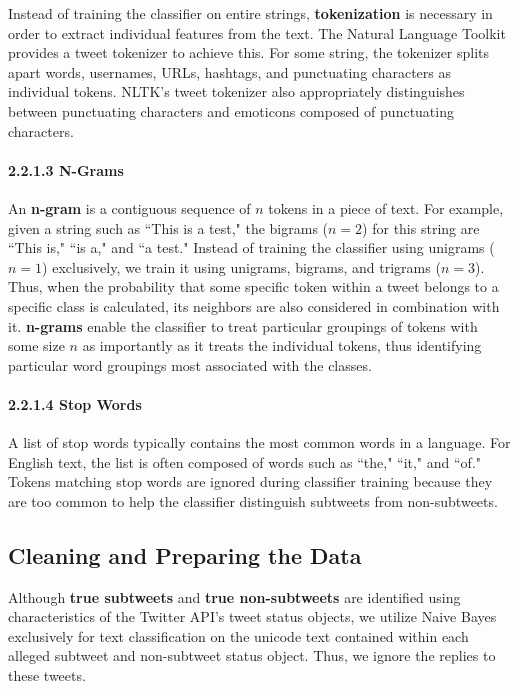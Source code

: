 \documentclass[11pt, twoside, reqno]{book}
\begin{document}
Instead of training the classifier on entire strings, \textbf{tokenization} is necessary in order to extract individual features from the text. The Natural Language Toolkit \cite{nltk} provides a tweet tokenizer to achieve this. For some string, the tokenizer splits apart words, usernames, URLs, hashtags, and punctuating characters as individual tokens. NLTK's tweet tokenizer also appropriately distinguishes between punctuating characters and emoticons composed of punctuating characters.

\paragraph{2.2.1.3  N-Grams}
\label{n_grams}

An \textbf{n-gram} is a contiguous sequence of $n$ tokens in a piece of text. For example, given a string such as ``This is a test," the bigrams ($n=2$) for this string are ``This is," ``is a," and ``a test." Instead of training the classifier using unigrams ($n=1$) exclusively, we train it using unigrams, bigrams, and trigrams ($n=3$). Thus, when the probability that some specific token within a tweet belongs to a specific class is calculated, its neighbors are also considered in combination with it. \textbf{n-grams} enable the classifier to treat particular groupings of tokens with some size $n$ as importantly as it treats the individual tokens, thus identifying particular word groupings most associated with the classes.

\paragraph{2.2.1.4  Stop Words}
\label{stop_words}

A list of stop words typically contains the most common words in a language. For English text, the list is often composed of words such as ``the," ``it," and ``of." Tokens matching stop words are ignored during classifier training because they are too common to help the classifier distinguish subtweets from non-subtweets. 

\subsection{Cleaning and Preparing the Data}
\label{cleaning_data}

Although \textbf{true subtweets} and \textbf{true non-subtweets} are identified using characteristics of the Twitter API's tweet status objects, we utilize Naive Bayes exclusively for text classification on the unicode text contained within each alleged subtweet and non-subtweet status object. Thus, we ignore the replies to these tweets. 
\end{document}
